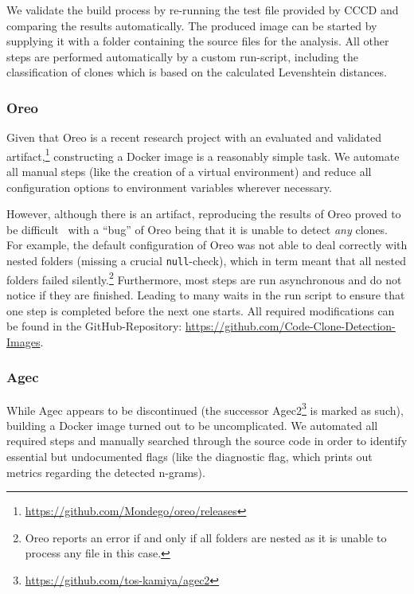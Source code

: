 \documentclass[10pt,journal,compsoc]{IEEEtran}
\def\T#1{\textsl{Type\nobreakdash-#1}}
\def\todo#1{\textcolor{brown!80!yellow!70!black!90!red}{[\textsc{todo}: \textsf{#1}]}}
\newcommand*\urldate[2]{\url{#1}\;\textsuperscript{\color{gray}\DTMdate{#2}}}
\newcommand*\footurl[3][]{\footnote{#1\urldate{#2}{#3}}}
\begin{document}
We validate the build process by re-running the test file provided by CCCD and comparing the results automatically.
The produced image can be started by supplying it with a folder containing the source files for the analysis. All other steps are performed automatically by a custom run-script, including the classification of clones which is based on the calculated Levenshtein distances.


\subsubsection{Oreo}

Given that Oreo is a recent research project with an evaluated and validated artifact,\footurl{https://github.com/Mondego/oreo/releases}{2022-03-01} constructing a Docker image is a reasonably simple task. We automate all manual steps (like the creation of a virtual environment) and reduce all configuration options to environment variables wherever necessary.

However, although there is an artifact, reproducing the results of Oreo proved to be difficult~\cite{wang2020detecting} with a \enquote{bug} of Oreo being that it is unable to detect \textit{any} clones.
For example, the default configuration of Oreo was not able to deal correctly with nested folders (missing a crucial \texttt{null}-check), which in term meant that all nested folders failed silently.\footnote{Oreo reports an error if and only if all folders are nested as it is unable to process any file in this case.}
Furthermore, most steps are run asynchronous and do not notice if they are finished. Leading to many waits in the run script to ensure that one step is completed before the next one starts.
All required modifications can be found in the GitHub-Repository: \urldate{https://github.com/Code-Clone-Detection-Images}{2022-02-13}.

\subsubsection{Agec}
While Agec appears to be discontinued (the successor Agec2\footurl{https://github.com/tos-kamiya/agec2}{2022-03-01} is marked as such), building a Docker image turned out to be uncomplicated.
We automated all required steps and manually searched through the source code in order to identify essential but undocumented flags (like the diagnostic flag, which prints out metrics regarding the detected n-grams).
\end{document}
